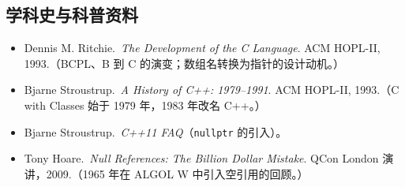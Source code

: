 \documentclass[UTF8,a4paper,11pt,fontset=none,zihao=-4]{ctexart}
\newcommand{\cc}[1]{\texttt{#1}}
\begin{document}
\subsection*{学科史与科普资料}
\begin{itemize}
  \item Dennis M. Ritchie.\ \emph{The Development of the C Language}. ACM HOPL-II, 1993.（BCPL、B 到 C 的演变；数组名转换为指针的设计动机。）
  \item Bjarne Stroustrup.\ \emph{A History of C++: 1979--1991}. ACM HOPL-II, 1993.（C with Classes 始于 1979 年，1983 年改名 C++。）
  \item Bjarne Stroustrup.\ \emph{C++11 FAQ}（\cc{nullptr} 的引入）。
  \item Tony Hoare.\ \emph{Null References: The Billion Dollar Mistake}. QCon London 演讲，2009.（1965 年在 ALGOL W 中引入空引用的回顾。）
\end{itemize}
\end{document}
